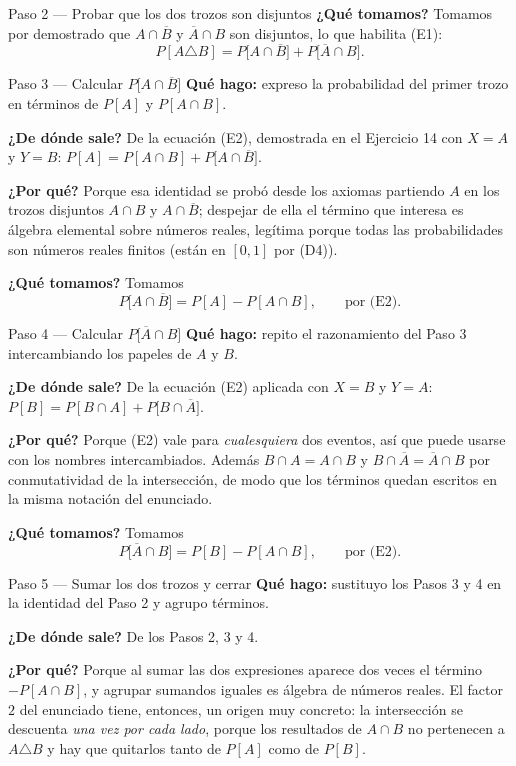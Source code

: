 \documentclass[11pt]{article}
\begin{document}
\begin{sol}
\begin{paso}{Paso 2 --- Probar que los dos trozos son disjuntos}
\textbf{¿Qué tomamos?} Tomamos por demostrado que $A\cap\overline{B}$ y $\overline{A}\cap B$ son
disjuntos, lo que habilita (E1):
\[
P[A\triangle B]=P\big[A\cap\overline{B}\big]+P\big[\overline{A}\cap B\big] .
\]
\end{paso}

\begin{paso}{Paso 3 --- Calcular $P\big[A\cap\overline{B}\big]$}
\textbf{Qué hago:} expreso la probabilidad del primer trozo en términos de $P[A]$ y
$P[A\cap B]$.

\textbf{¿De dónde sale?} De la ecuación (E2), demostrada en el Ejercicio 14 con $X=A$ y $Y=B$:
$P[A]=P[A\cap B]+P\big[A\cap\overline{B}\big]$.

\textbf{¿Por qué?} Porque esa identidad se probó desde los axiomas partiendo $A$ en los trozos
disjuntos $A\cap B$ y $A\cap\overline{B}$; despejar de ella el término que interesa es álgebra
elemental sobre números reales, legítima porque todas las probabilidades son números reales
finitos (están en $[0,1]$ por (D4)).

\textbf{¿Qué tomamos?} Tomamos
\[
P\big[A\cap\overline{B}\big]=P[A]-P[A\cap B] , \qquad\text{por (E2)} .
\]
\end{paso}

\begin{paso}{Paso 4 --- Calcular $P\big[\overline{A}\cap B\big]$}
\textbf{Qué hago:} repito el razonamiento del Paso 3 intercambiando los papeles de $A$ y $B$.

\textbf{¿De dónde sale?} De la ecuación (E2) aplicada con $X=B$ y $Y=A$:
$P[B]=P[B\cap A]+P\big[B\cap\overline{A}\big]$.

\textbf{¿Por qué?} Porque (E2) vale para \emph{cualesquiera} dos eventos, así que puede usarse
con los nombres intercambiados. Además $B\cap A=A\cap B$ y $B\cap\overline{A}=\overline{A}\cap B$
por conmutatividad de la intersección, de modo que los términos quedan escritos en la misma
notación del enunciado.

\textbf{¿Qué tomamos?} Tomamos
\[
P\big[\overline{A}\cap B\big]=P[B]-P[A\cap B] , \qquad\text{por (E2)} .
\]
\end{paso}

\begin{paso}{Paso 5 --- Sumar los dos trozos y cerrar}
\textbf{Qué hago:} sustituyo los Pasos 3 y 4 en la identidad del Paso 2 y agrupo términos.

\textbf{¿De dónde sale?} De los Pasos 2, 3 y 4.

\textbf{¿Por qué?} Porque al sumar las dos expresiones aparece dos veces el término
$-P[A\cap B]$, y agrupar sumandos iguales es álgebra de números reales. El factor $2$ del
enunciado tiene, entonces, un origen muy concreto: la intersección se descuenta \emph{una vez
por cada lado}, porque los resultados de $A\cap B$ no pertenecen a $A\triangle B$ y hay que
quitarlos tanto de $P[A]$ como de $P[B]$.


\end{paso}
\end{sol}
\end{document}
